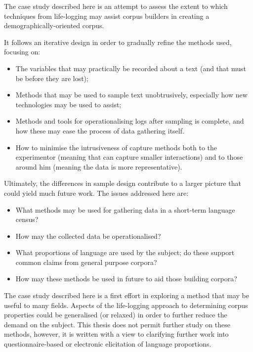 
The case study described here is an attempt to assess the extent to which techniques from life-logging may assist corpus builders in creating a demographically-oriented corpus.

It follows an iterative design in order to gradually refine the methods used, focusing on:

\begin{itemize}
    \item The variables that may practically be recorded about a text (and that must be before they are lost);
    \item Methods that may be used to sample text unobtrusively, especially how new technologies may be used to assist;
    \item Methods and tools for operationalising logs after sampling is complete, and how these may ease the process of data gathering itself.
    \item How to minimise the intrusiveness of capture methods both to the experimentor (meaning that can capture smaller interactions) and to those around him (meaning the data is more representative).
\end{itemize}

Ultimately, the differences in sample design contribute to a larger picture that could yield much future work.  The issues addressed here are:

\begin{itemize}
    \item What methods may be used for gathering data in a short-term language census?
    \item How may the collected data be operationalised?
    \item What proportions of language are used by the subject; do these support common claims from general purpose corpora?
    \item How may these methods be used in future to aid those building corpora?
\end{itemize}


The case study described here is a first effort in exploring a method that may be useful to many fields.  Aspects of the life-logging approach to determining corpus properties could be generalised (or relaxed) in order to further reduce the demand on the subject.  This thesis does not permit further study on these methods, however, it is written with a view to clarifying further work into questionnaire-based or electronic elicitation of language proportions.






